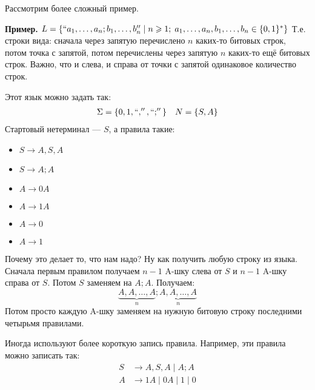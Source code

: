Рассмотрим более сложный пример.

\textbf{Пример.} $L = \{``a_1,\dots,a_n;b_1,\dots,b_n'' \mid n \geqslant 1; \; a_1,\dots,a_n,b_1,\dots,b_n \in \{0, 1\}^* \} $ Т.е. строки вида: сначала через запятую перечислено $n$ каких-то битовых строк, потом точка с запятой, потом перечислены через запятую $n$ каких-то ещё битовых строк. Важно, что и слева, и справа от точки с запятой одинаковое количество строк.

Этот язык можно задать так:
\begin{align*}
    \Sigma = \{ 0, 1, ``,'', ``;'' \} && N = \{ S, A \}
\end{align*}
Стартовый нетерминал --- $S$, а правила такие:
\begin{itemize}
    \item $S \to A,S,A$
    \item $S \to A;A$
    \item $A \to 0A$
    \item $A \to 1A$
    \item $A \to 0$
    \item $A \to 1$
\end{itemize}
Почему это делает то, что нам надо? Ну как получить любую строку из языка. Сначала первым правилом получаем $n-1$ A-шку слева от $S$ и $n-1$ A-шку справа от $S$. Потом $S$ заменяем на $A;A$. Получаем:
$$ \underbrace{A,A,\dots,A}_{n};\underbrace{A,A,\dots,A}_{n}$$
Потом просто каждую A-шку заменяем на нужную битовую строку последними четырьмя правилами.

Иногда используют более короткую запись правила. Например, эти правила можно записать так:
\begin{align*}
    S &\to A,S,A \mid A;A \\
    A &\to 1A \mid 0A \mid 1 \mid 0
\end{align*}

